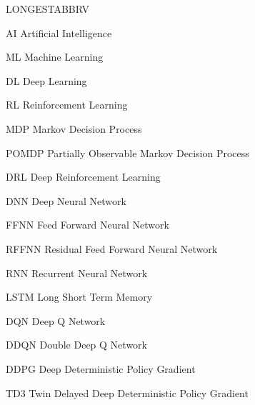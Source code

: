 \begin{theglossary}{LONGESTABBRV}
\item[AI] Artificial Intelligence
\item[ML] Machine Learning
\item[DL] Deep Learning
\item[RL] Reinforcement Learning
\item[MDP] Markov Decision Process
\item[POMDP] Partially Observable Markov Decision Process
\item[DRL] Deep Reinforcement Learning
\item[DNN] Deep Neural Network
\item[FFNN] Feed Forward Neural Network
\item[RFFNN] Residual Feed Forward Neural Network
\item[RNN] Recurrent Neural Network
\item[LSTM] Long Short Term Memory
\item[DQN] Deep Q Network
\item[DDQN] Double Deep Q Network
\item[DDPG] Deep Deterministic Policy Gradient
\item[TD3] Twin Delayed Deep Deterministic Policy Gradient
\end{theglossary}
